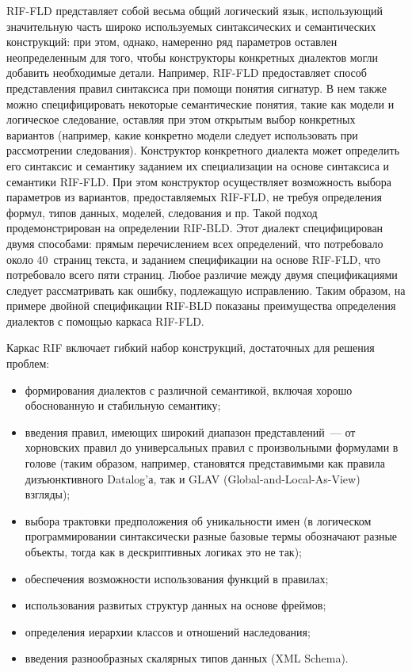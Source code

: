 \begin{multicols}{2}
RIF-FLD представляет собой весьма общий логический язык, использующий значительную 
часть широко используемых синтаксических и семантических конструкций: при этом, 
однако, намеренно ряд параметров оставлен неопределенным для того, чтобы 
конструкторы конкретных диалектов могли добавить необходимые детали. Например, 
RIF-FLD предоставляет способ представления правил синтаксиса при помощи понятия 
сигнатур. В нем также можно специфицировать некоторые семантические понятия, такие 
как модели и логическое следование, оставляя при этом открытым выбор конкретных 
вариантов (например, какие конкретно модели следует использовать при рассмотрении 
следования). Конструктор конкретного диалекта может определить его синтаксис и 
семантику заданием их специализации на основе синтаксиса и семантики RIF-FLD. При этом 
конструктор осуществляет возможность выбора параметров из вариантов, 
предоставляемых RIF-FLD, не требуя определения формул, типов данных, моделей, 
следования и пр. Такой подход продемонстрирован на определении RIF-BLD. Этот диалект 
специфицирован двумя способами: прямым пе\-ре\-чис\-ле\-ни\-ем всех определений, что 
потребовало около 40~страниц текста, и заданием спецификации на основе RIF-FLD, что 
потребовало всего пяти страниц. Любое различие между двумя спецификациями следует 
рассматривать как ошибку, подлежащую исправлению. Таким образом, на примере двойной 
спецификации RIF-BLD показаны преимущества определения диалектов с помощью каркаса 
RIF-FLD.

Каркас RIF включает гибкий набор конструкций, достаточных для решения проблем: 
\begin{itemize}
\item формирования диалектов с различной семантикой, включая хорошо обоснованную и стабильную 
семантику;
\item введения правил, имеющих широкий диапазон представлений~--- от хорновских правил до 
универсальных правил с произвольными формулами в голове (таким образом, например, становятся 
представимыми как правила дизъюнктивного Datalog'а, так и GLAV (Global-and-Local-As-View) взгля\-ды);
\item выбора трактовки предположения об уникальности имен (в логическом программировании 
синтаксически разные базовые термы обозначают разные объекты, тогда как в дескриптивных логиках это 
не так);
\item обеспечения возможности использования функций в правилах;
\item использования развитых структур данных на основе фреймов;
\item определения иерархии классов и отношений наследования;
\item введения разнообразных скалярных типов данных (XML Schema).
\end{itemize}


\end{multicols}
